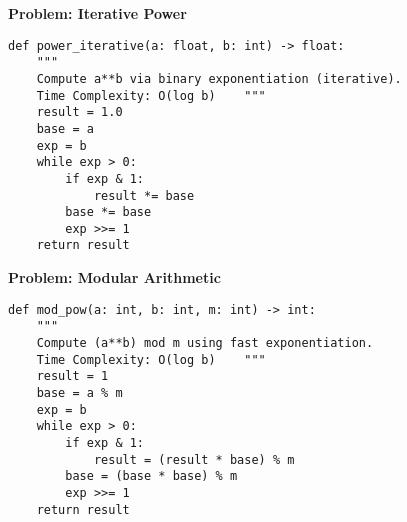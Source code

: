 \noindent\textbf{Problem: Iterative Power}
\begin{verbatim}
def power_iterative(a: float, b: int) -> float:
    """
    Compute a**b via binary exponentiation (iterative).
    Time Complexity: O(log b)    """
    result = 1.0
    base = a
    exp = b
    while exp > 0:
        if exp & 1:
            result *= base
        base *= base
        exp >>= 1
    return result
\end{verbatim}
\noindent\textbf{Problem: Modular Arithmetic}
\begin{verbatim}
def mod_pow(a: int, b: int, m: int) -> int:
    """
    Compute (a**b) mod m using fast exponentiation.
    Time Complexity: O(log b)    """
    result = 1
    base = a % m
    exp = b
    while exp > 0:
        if exp & 1:
            result = (result * base) % m
        base = (base * base) % m
        exp >>= 1
    return result
\end{verbatim}
% 
